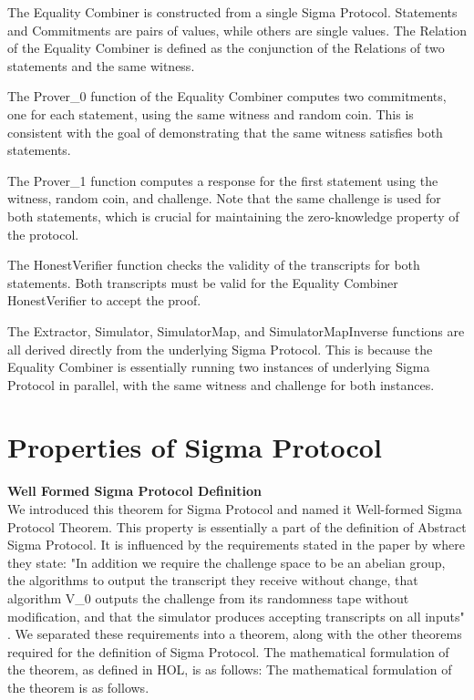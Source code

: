 The Equality Combiner is constructed from a single Sigma Protocol. Statements and Commitments are pairs of values, while others are single values. The Relation of the Equality Combiner is defined as the conjunction of the Relations of two statements and the same witness. 

The Prover_0 function of the Equality Combiner computes two commitments, one for each statement, using the same witness and random coin. This is consistent with the goal of demonstrating that the same witness satisfies both statements.

The Prover_1 function computes a response for the first statement using the witness, random coin, and challenge. Note that the same challenge is used for both statements, which is crucial for maintaining the zero-knowledge property of the protocol.

The HonestVerifier function checks the validity of the transcripts for both statements. Both transcripts must be valid for the Equality Combiner HonestVerifier to accept the proof.

The Extractor, Simulator, SimulatorMap, and SimulatorMapInverse functions are all derived directly from the underlying Sigma Protocol. 
This is because the Equality Combiner is essentially running two instances of underlying Sigma Protocol in parallel, 
with the same witness and challenge for both instances.
\newpage
\section{Properties of Sigma Protocol}
\textbf{Well Formed Sigma Protocol Definition}\\
We introduced this theorem for Sigma Protocol and named it Well-formed Sigma Protocol Theorem. This property is essentially a part of the definition of Abstract Sigma Protocol. It is influenced by the requirements stated in the paper by \cite{Haines2019VerifiedVF}  where they state:
"In addition we require the challenge space to be an abelian group, the algorithms to output the transcript they receive without change, that algorithm V_0 outputs the challenge from its randomness tape without modification, and that the simulator produces accepting transcripts on all inputs"\cite{Haines2019VerifiedVF} .
We separated these requirements into a theorem, along with the other theorems required for the definition of Sigma Protocol. The mathematical formulation of the theorem, as defined in HOL, is as follows:
The mathematical formulation of the theorem is as follows.

